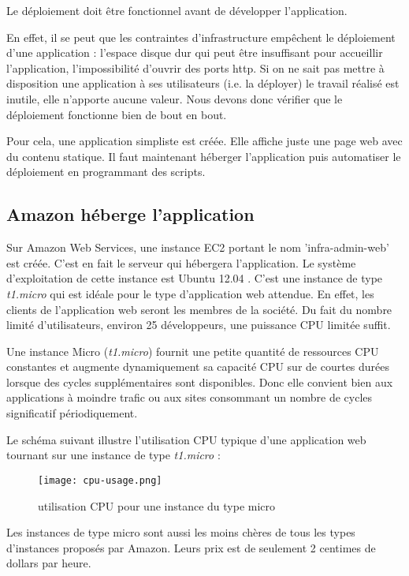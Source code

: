 Le déploiement doit être fonctionnel avant de développer l'application.

En effet, il se peut que les contraintes d'infrastructure empêchent
le déploiement d'une application : l'espace disque dur qui peut être insuffisant
pour accueillir l'application, l'impossibilité d'ouvrir des ports http.
Si on ne sait pas mettre à disposition une application à ses
utilisateurs (i.e. la déployer) le travail réalisé est inutile, elle n'apporte
aucune valeur.
Nous devons donc vérifier que le déploiement fonctionne bien de bout en bout.

Pour cela, une application simpliste est créée.
Elle affiche juste une page web avec du contenu statique.
Il faut maintenant héberger l'application puis automatiser le déploiement en
programmant des scripts.

\subsection{Amazon héberge l'application}

Sur Amazon Web Services, une instance EC2 portant le nom 'infra-admin-web' est
créée. C'est en fait le serveur qui hébergera l'application. Le
système d'exploitation de cette instance est Ubuntu 12.04 .
C'est une instance de type \textit{t1.micro} qui est idéale pour le type
d'application web attendue.
En effet, les clients de l'application web seront les membres de la société.
Du fait du nombre limité d'utilisateurs, environ 25 développeurs,
une puissance CPU limitée suffit.

Une instance Micro (\textit{t1.micro}) fournit une petite quantité de ressources CPU
constantes et augmente dynamiquement sa capacité CPU sur de courtes durées
lorsque des cycles supplémentaires sont disponibles. Donc elle convient bien
aux applications à moindre trafic ou aux sites consommant un nombre de cycles
significatif périodiquement.

Le schéma suivant illustre l'utilisation CPU typique d'une application web
tournant sur une instance de type \textit{t1.micro} :
\begin{figure}[H]
  \begin{center}
    \texttt{[image: cpu-usage.png]} 
  \end{center}
  \caption{utilisation CPU pour une instance du type micro}
\end{figure}

Les instances de type micro sont aussi les moins chères de tous les types
d'instances proposés par Amazon. Leurs prix est de seulement 2 centimes de
dollars par heure.


